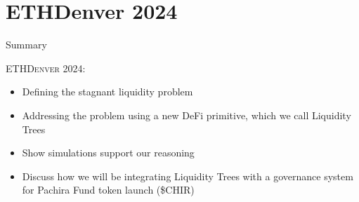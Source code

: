 \documentclass[10pt,xcolor=svgnames]{beamer} %
\begin{document}
\section{ETHDenver 2024}

\begin{frame}{Summary}

\begin{exampleblock}{\textsc{ETHDenver 2024:}}
\begin{itemize}
  \item Defining the stagnant liquidity problem
  \item Addressing the problem using a new DeFi primitive, which we call Liquidity Trees 
  \item Show simulations support our reasoning
  \item Discuss how we will be integrating Liquidity Trees with a governance system for Pachira Fund token launch (\$CHIR)
\end{itemize}
\end{exampleblock}
\end{frame}
\end{document}

